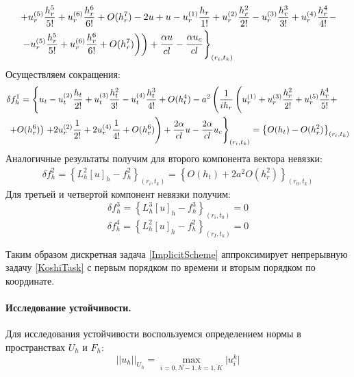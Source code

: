 \documentclass[a4paper,12pt,russian, fleqn]{extreport}
\begin{document}
 	\begin{align}
	 	& \left. + u^{(5)}_r\dfrac{h^5_r}{5!} + u^{(6)}_r\dfrac{h^6_r}{6!} + O(h_r^7) - 2u + u - u^{(1)}_r\dfrac{h_r}{1!} + u^{(2)}_r\dfrac{h^2_r}{2!} - u^{(3)}_r\dfrac{h^3_r}{3!} + u^{(4)}_r\dfrac{h^4_r}{4!} - \right. \nonumber \\
	 	& \left. \left. \left. - u^{(5)}_r\dfrac{h^5_r}{5!} + u^{(6)}_r\dfrac{h^6_r}{6!} + O(h_r^7)  \right) \right) + \dfrac{\strut \alpha u}{\strut cl} - \dfrac{\strut \alpha u_c}{cl}\right\}_{(r_i, t_k)} \nonumber
 	\end{align}
 	Осуществляем сокращения:
 	\begin{align}
 		& \delta f_h^1 = \left\{ u_t - u_t^{(2)}\dfrac{\strut h_t}{\strut 2!} +  u_t^{(3)}\dfrac{\strut h_t^2}{\strut 3!} -  u_t^{(4)}\dfrac{\strut h_t^3}{\strut 4!} + O(h_t^4) - a^2 \left( \dfrac{1}{ih_r}\left(u_r^{(1)} + u_r^{(3)}\dfrac{\strut h_r^2}{\strut 2!} + u_r^{(5)}\dfrac{\strut h_r^4}{\strut 5!} + \right. \right. \right. \nonumber  \\ 
 		& \left. \left. + O(h_r^6) \right) \left. + 2u_r^{(2)}\dfrac{\strut 1}{2!} + 2u_r^{(4)}\dfrac{\strut 1}{\strut 4!} + O(h_r^6) \right) + \dfrac{2\alpha}{cl}u - \dfrac{2\alpha}{cl}u_c \right\}_{(r_i, t_k)}  \nonumber = \left\{ O(h_t) - O(h_r^2) \right\}_{(r_i, t_k)}
 	\end{align}
 	Аналогичные результаты получим для второго компонента вектора невязки:
 	\begin{align}
	 	\delta f^2_h = \left\{ L^2_h[u]_h - f^2_h \right\} _{(r_i, t_k)} = \left\{ O(h_t) + 2a^2O(h_r^2)\right\}_{(r_0, t_k)} \nonumber
 	\end{align}	
 	Для третьей и четвертой компонент невязки получим:
 	\begin{equation*}
	 	\delta f^3_h = \left\{ L_h^3[u]_h - f^3_h \right\}_{(r_i, t_0)} = 0
 	\end{equation*}
 	\begin{equation*}
	 	\delta f^4_h = \left\{ L_h^2[u]_h - f^2_h \right\}_{(r_I, t_k)} = 0
 	\end{equation*}
 	
 	Таким образом дискретная задача \eqref{ImplicitScheme} аппроксимирует непрерывную задачу \eqref{KoshiTask} с первым порядком по времени и вторым порядком по координате.
 	
 	\paragraph{Исследование устойчивости.} Для исследования устойчивости воспользуемся определением нормы в пространствах $U_h$ и $F_h$:
 	\begin{equation*}
 		\lvert\lvert u_h \rvert\rvert_{U_h} = \max\limits_{i=\overline{0,N-1}, k=\overline{1,K}} {\vert u_i^k \vert}
 	\end{equation*}
 	
\end{document}
